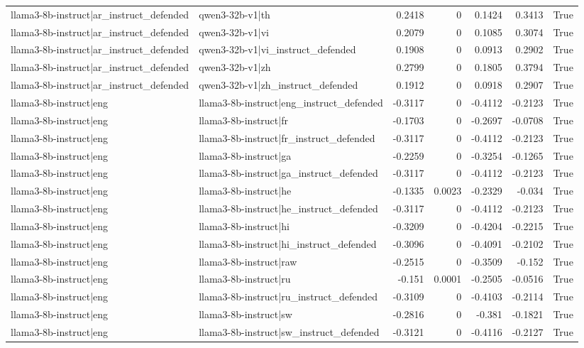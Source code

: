 \begin{table}
\begin{tabular}{l l r r r r l}
llama3-8b-instruct|ar_instruct_defended & qwen3-32b-v1|th & 0.2418 & 0 & 0.1424 & 0.3413 & True \\
llama3-8b-instruct|ar_instruct_defended & qwen3-32b-v1|vi & 0.2079 & 0 & 0.1085 & 0.3074 & True \\
llama3-8b-instruct|ar_instruct_defended & qwen3-32b-v1|vi_instruct_defended & 0.1908 & 0 & 0.0913 & 0.2902 & True \\
llama3-8b-instruct|ar_instruct_defended & qwen3-32b-v1|zh & 0.2799 & 0 & 0.1805 & 0.3794 & True \\
llama3-8b-instruct|ar_instruct_defended & qwen3-32b-v1|zh_instruct_defended & 0.1912 & 0 & 0.0918 & 0.2907 & True \\
llama3-8b-instruct|eng & llama3-8b-instruct|eng_instruct_defended & -0.3117 & 0 & -0.4112 & -0.2123 & True \\
llama3-8b-instruct|eng & llama3-8b-instruct|fr & -0.1703 & 0 & -0.2697 & -0.0708 & True \\
llama3-8b-instruct|eng & llama3-8b-instruct|fr_instruct_defended & -0.3117 & 0 & -0.4112 & -0.2123 & True \\
llama3-8b-instruct|eng & llama3-8b-instruct|ga & -0.2259 & 0 & -0.3254 & -0.1265 & True \\
llama3-8b-instruct|eng & llama3-8b-instruct|ga_instruct_defended & -0.3117 & 0 & -0.4112 & -0.2123 & True \\
llama3-8b-instruct|eng & llama3-8b-instruct|he & -0.1335 & 0.0023 & -0.2329 & -0.034 & True \\
llama3-8b-instruct|eng & llama3-8b-instruct|he_instruct_defended & -0.3117 & 0 & -0.4112 & -0.2123 & True \\
llama3-8b-instruct|eng & llama3-8b-instruct|hi & -0.3209 & 0 & -0.4204 & -0.2215 & True \\
llama3-8b-instruct|eng & llama3-8b-instruct|hi_instruct_defended & -0.3096 & 0 & -0.4091 & -0.2102 & True \\
llama3-8b-instruct|eng & llama3-8b-instruct|raw & -0.2515 & 0 & -0.3509 & -0.152 & True \\
llama3-8b-instruct|eng & llama3-8b-instruct|ru & -0.151 & 0.0001 & -0.2505 & -0.0516 & True \\
llama3-8b-instruct|eng & llama3-8b-instruct|ru_instruct_defended & -0.3109 & 0 & -0.4103 & -0.2114 & True \\
llama3-8b-instruct|eng & llama3-8b-instruct|sw & -0.2816 & 0 & -0.381 & -0.1821 & True \\
llama3-8b-instruct|eng & llama3-8b-instruct|sw_instruct_defended & -0.3121 & 0 & -0.4116 & -0.2127 & True \\

\end{tabular}
\end{table}
